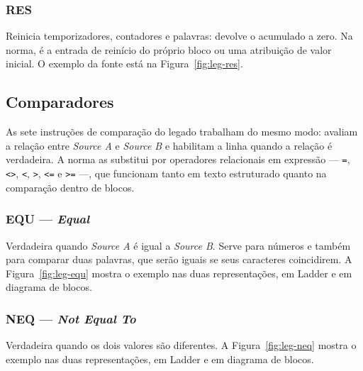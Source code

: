 
\subsubsection{RES}

Reinicia temporizadores, contadores e palavras: devolve o acumulado a zero. Na norma, é a entrada de
reinício do próprio bloco ou uma atribuição de valor inicial.
O exemplo da fonte está na Figura~\ref{fig:leg-res}.


\subsection{Comparadores}

As sete instruções de comparação do legado trabalham do mesmo modo: avaliam a relação entre
\emph{Source A} e \emph{Source B} e habilitam a linha quando a relação é verdadeira. A norma as
substitui por operadores relacionais em expressão --- \texttt{=}, \texttt{<>}, \texttt{<}, \texttt{>},
\texttt{<=} e \texttt{>=} ---, que funcionam tanto em texto estruturado quanto na comparação dentro de
blocos.

\subsubsection{EQU --- \emph{Equal}}

Verdadeira quando \emph{Source A} é igual a \emph{Source B}. Serve para números e também para comparar
duas palavras, que serão iguais se seus caracteres coincidirem.
A Figura~\ref{fig:leg-equ} mostra o exemplo nas duas representações, em Ladder e em diagrama de blocos.


\subsubsection{NEQ --- \emph{Not Equal To}}

Verdadeira quando os dois valores são diferentes.
A Figura~\ref{fig:leg-neq} mostra o exemplo nas duas representações, em Ladder e em diagrama de blocos.

